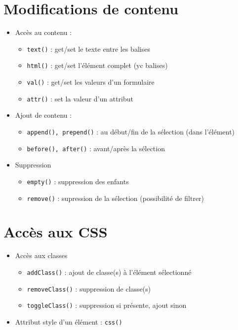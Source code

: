 \hypertarget{modifications-de-contenu}{%
\section{Modifications de contenu}\label{modifications-de-contenu}}

\begin{itemize}
\tightlist
\item
  Accès au contenu :

  \begin{itemize}
  \tightlist
  \item
    \textenglish{\texttt{text()}} : get/set le texte entre les balises
  \item
    \textenglish{\texttt{html()}} : get/set l'élément complet (yc
    balises)
  \item
    \textenglish{\texttt{val()}} : get/set les valeurs d'un formulaire
  \item
    \textenglish{\texttt{attr()}} : set la valeur d'un attribut
  \end{itemize}
\item
  Ajout de contenu :

  \begin{itemize}
  \tightlist
  \item
    \textenglish{\texttt{append(),\ prepend()}} : au début/fin de la
    sélection (dans l'élément)
  \item
    \textenglish{\texttt{before(),\ after()}} : avant/après la sélection
  \end{itemize}
\item
  Suppression

  \begin{itemize}
  \tightlist
  \item
    \textenglish{\texttt{empty()}} : suppression des enfants
  \item
    \textenglish{\texttt{remove()}} : supression de la sélection
    (possibilité de filtrer)
  \end{itemize}
\end{itemize}

\hypertarget{accuxe8s-aux-css}{%
\section{Accès aux CSS}\label{accuxe8s-aux-css}}

\begin{itemize}
\tightlist
\item
  Accès aux classes

  \begin{itemize}
  \tightlist
  \item
    \textenglish{\texttt{addClass()}} : ajout de classe(s) à l'élément
    sélectionné
  \item
    \textenglish{\texttt{removeClass()}} : suppression de classe(s)
  \item
    \textenglish{\texttt{toggleClass()}} : suppression si présente,
    ajout sinon
  \end{itemize}
\item
  Attribut style d'un élément : \textenglish{\texttt{css()}}
\end{itemize}

